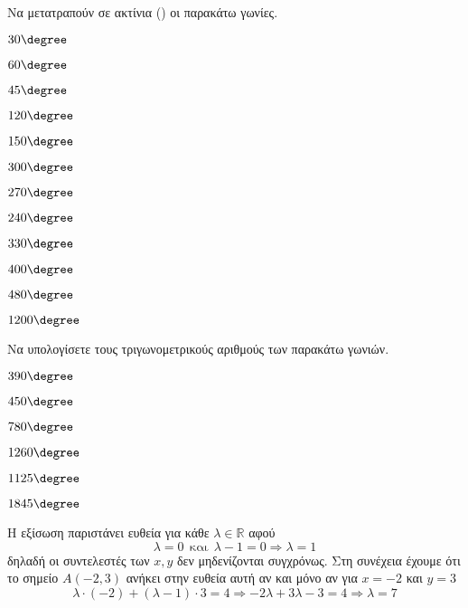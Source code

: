 Να μετατραπούν σε ακτίνια () οι παρακάτω γωνίες.
\begin{multicols}{3}
\begin{alist}
\item $ 30\degree $
\item $ 60\degree $
\item $ 45\degree $
\item $ 120\degree $
\item $ 150\degree $
\item $ 300\degree $
\item $ 270\degree $
\item $ 240\degree $
\item $ 330\degree $
\item $ 400\degree $
\item $ 480\degree $
\item $ 1200\degree $
\end{alist}
\end{multicols}

Να υπολογίσετε τους τριγωνομετρικούς αριθμούς των παρακάτω γωνιών.
\begin{multicols}{3}
\begin{rlist}
\item $ 390\degree $
\item $ 450\degree $
\item $ 780\degree $
\item $ 1260\degree $
\item $ 1125\degree $
\item $ 1845\degree $
\end{rlist}
\end{multicols}


Η εξίσωση παριστάνει ευθεία για κάθε $ \lambda\in\mathbb{R} $ αφού
\[ \lambda=0\ \ \text{και}\ \ \lambda-1=0\Rightarrow\lambda=1 \]
δηλαδή οι συντελεστές των $ x,y $ δεν μηδενίζονται συγχρόνως. Στη συνέχεια έχουμε ότι το σημείο $ A(-2,3) $ ανήκει στην ευθεία αυτή αν και μόνο αν για $ x=-2 $ και $ y=3 $
\[ \lambda\cdot(-2)+(\lambda-1)\cdot 3=4\Rightarrow -2\lambda+3\lambda-3=4\Rightarrow \lambda=7 \]
